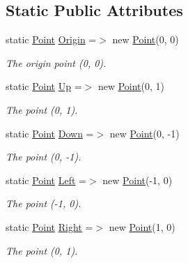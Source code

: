 \subsection*{Static Public Attributes}
\begin{DoxyCompactItemize}
\item 
static \mbox{\hyperlink{struct_s_g_l_1_1_point}{Point}} \mbox{\hyperlink{struct_s_g_l_1_1_point_a4dd7959c1b84f270da8c3b51c2bc0a11}{Origin}} =$>$ new \mbox{\hyperlink{struct_s_g_l_1_1_point}{Point}}(0, 0)
\begin{DoxyCompactList}\small\item\em The origin point (0, 0). \end{DoxyCompactList}\item 
static \mbox{\hyperlink{struct_s_g_l_1_1_point}{Point}} \mbox{\hyperlink{struct_s_g_l_1_1_point_a08d6f7dd7dfb57c6e1be9ce0e7843b9d}{Up}} =$>$ new \mbox{\hyperlink{struct_s_g_l_1_1_point}{Point}}(0, 1)
\begin{DoxyCompactList}\small\item\em The point (0, 1). \end{DoxyCompactList}\item 
static \mbox{\hyperlink{struct_s_g_l_1_1_point}{Point}} \mbox{\hyperlink{struct_s_g_l_1_1_point_a0bc08cef11531d4036aa895d2c33af1e}{Down}} =$>$ new \mbox{\hyperlink{struct_s_g_l_1_1_point}{Point}}(0, -\/1)
\begin{DoxyCompactList}\small\item\em The point (0, -\/1). \end{DoxyCompactList}\item 
static \mbox{\hyperlink{struct_s_g_l_1_1_point}{Point}} \mbox{\hyperlink{struct_s_g_l_1_1_point_a26624170987d06859725b637117fa211}{Left}} =$>$ new \mbox{\hyperlink{struct_s_g_l_1_1_point}{Point}}(-\/1, 0)
\begin{DoxyCompactList}\small\item\em The point (-\/1, 0). \end{DoxyCompactList}\item 
static \mbox{\hyperlink{struct_s_g_l_1_1_point}{Point}} \mbox{\hyperlink{struct_s_g_l_1_1_point_a320d6bfd5119b652d958b5f72e2f737c}{Right}} =$>$ new \mbox{\hyperlink{struct_s_g_l_1_1_point}{Point}}(1, 0)
\begin{DoxyCompactList}\small\item\em The point (0, 1). \end{DoxyCompactList}\end{DoxyCompactItemize}
